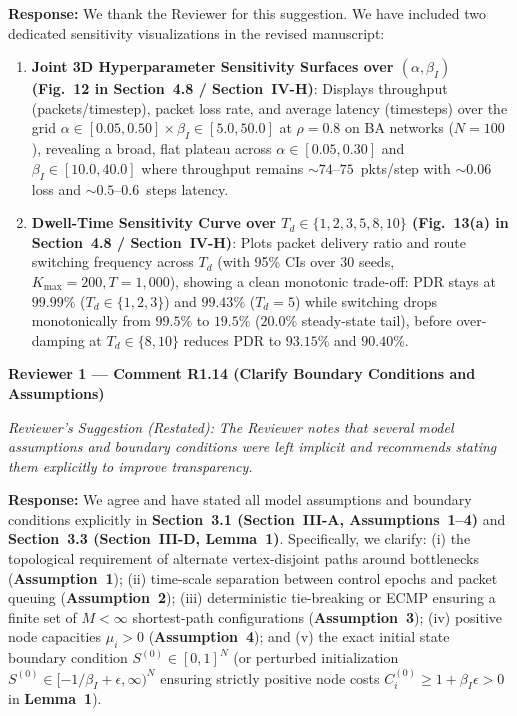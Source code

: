 \documentclass[11pt,a4paper]{article}
\newcommand{\cbox}[2]{%
  \vspace{0.6em}\noindent\textbf{#1}\par\smallskip
  \noindent\textit{Reviewer's Suggestion (Restated):} \textit{#2}\par\smallskip
}
\begin{document}
\noindent\textbf{Response:} We thank the Reviewer for this suggestion. We have included two dedicated sensitivity visualizations in the revised manuscript:
\begin{enumerate}[leftmargin=1.8em]
    \item \textbf{Joint 3D Hyperparameter Sensitivity Surfaces over $(\alpha, \beta_I)$ (\textbf{Fig.~12} in Section~4.8 / Section~IV-H)}: Displays throughput (packets/timestep), packet loss rate, and average latency (timesteps) over the grid $\alpha \in [0.05, 0.50] \times \beta_I \in [5.0, 50.0]$ at $\rho=0.8$ on BA networks ($N=100$), revealing a broad, flat plateau across $\alpha \in [0.05, 0.30]$ and $\beta_I \in [10.0, 40.0]$ where throughput remains $\sim 74$--$75$~pkts/step with $\sim 0.06$ loss and $\sim 0.5$--$0.6$~steps latency.
    \item \textbf{Dwell-Time Sensitivity Curve over $T_d \in \{1, 2, 3, 5, 8, 10\}$ (\textbf{Fig.~13(a)} in Section~4.8 / Section~IV-H)}: Plots packet delivery ratio and route switching frequency across $T_d$ (with 95\% CIs over 30 seeds, $K_{\max}=200, T=1{,}000$), showing a clean monotonic trade-off: PDR stays at $99.99\%$ ($T_d \in \{1,2,3\}$) and $99.43\%$ ($T_d=5$) while switching drops monotonically from $99.5\%$ to $19.5\%$ ($20.0\%$ steady-state tail), before over-damping at $T_d \in \{8, 10\}$ reduces PDR to $93.15\%$ and $90.40\%$.
\end{enumerate}

\hrulefill

\cbox{Reviewer 1 --- Comment R1.14 (Clarify Boundary Conditions and Assumptions)}{The Reviewer notes that several model assumptions and boundary conditions were left implicit and recommends stating them explicitly to improve transparency.}

\noindent\textbf{Response:} We agree and have stated all model assumptions and boundary conditions explicitly in \textbf{Section~3.1 (Section~III-A, Assumptions~1--4)} and \textbf{Section~3.3 (Section~III-D, Lemma~1)}. Specifically, we clarify: (i) the topological requirement of alternate vertex-disjoint paths around bottlenecks (\textbf{Assumption~1}); (ii) time-scale separation between control epochs and packet queuing (\textbf{Assumption~2}); (iii) deterministic tie-breaking or ECMP ensuring a finite set of $M < \infty$ shortest-path configurations (\textbf{Assumption~3}); (iv) positive node capacities $\mu_i > 0$ (\textbf{Assumption~4}); and (v) the exact initial state boundary condition $S^{(0)} \in [0,1]^N$ (or perturbed initialization $S^{(0)} \in [-1/\beta_I+\epsilon, \infty)^N$ ensuring strictly positive node costs $C_i^{(0)} \ge 1+\beta_I\epsilon > 0$ in \textbf{Lemma~1}).
\end{document}
